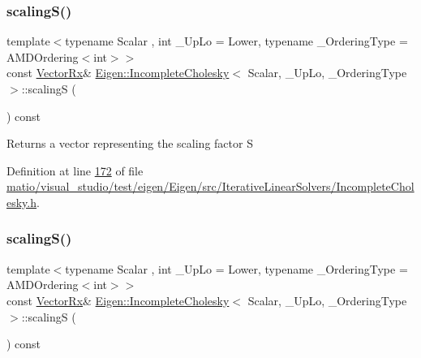 \subsubsection{\texorpdfstring{scaling\+S()}{scalingS()}\hspace{0.1cm}{\footnotesize\ttfamily [1/2]}}
{\footnotesize\ttfamily template$<$typename Scalar , int \+\_\+\+Up\+Lo = Lower, typename \+\_\+\+Ordering\+Type  = A\+M\+D\+Ordering$<$int$>$$>$ \\
const \hyperlink{group___core___module}{Vector\+Rx}\& \hyperlink{class_eigen_1_1_incomplete_cholesky}{Eigen\+::\+Incomplete\+Cholesky}$<$ Scalar, \+\_\+\+Up\+Lo, \+\_\+\+Ordering\+Type $>$\+::scalingS (\begin{DoxyParamCaption}{ }\end{DoxyParamCaption}) const\hspace{0.3cm}{\ttfamily [inline]}}

\begin{DoxyReturn}{Returns}
a vector representing the scaling factor S 
\end{DoxyReturn}


Definition at line \hyperlink{matio_2visual__studio_2test_2eigen_2_eigen_2src_2_iterative_linear_solvers_2_incomplete_cholesky_8h_source_l00172}{172} of file \hyperlink{matio_2visual__studio_2test_2eigen_2_eigen_2src_2_iterative_linear_solvers_2_incomplete_cholesky_8h_source}{matio/visual\+\_\+studio/test/eigen/\+Eigen/src/\+Iterative\+Linear\+Solvers/\+Incomplete\+Cholesky.\+h}.

\mbox{\label{class_eigen_1_1_incomplete_cholesky_a30d66dd77147a84ec3302e7d5fe5d924}} 
\subsubsection{\texorpdfstring{scaling\+S()}{scalingS()}\hspace{0.1cm}{\footnotesize\ttfamily [2/2]}}
{\footnotesize\ttfamily template$<$typename Scalar , int \+\_\+\+Up\+Lo = Lower, typename \+\_\+\+Ordering\+Type  = A\+M\+D\+Ordering$<$int$>$$>$ \\
const \hyperlink{group___core___module}{Vector\+Rx}\& \hyperlink{class_eigen_1_1_incomplete_cholesky}{Eigen\+::\+Incomplete\+Cholesky}$<$ Scalar, \+\_\+\+Up\+Lo, \+\_\+\+Ordering\+Type $>$\+::scalingS (\begin{DoxyParamCaption}{ }\end{DoxyParamCaption}) const\hspace{0.3cm}{\ttfamily [inline]}}

